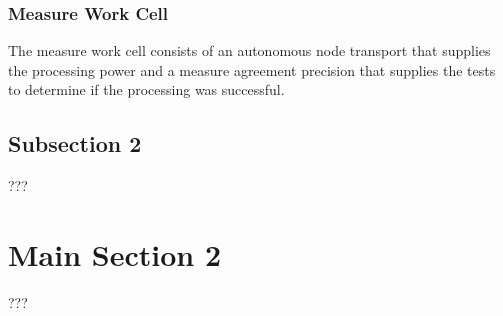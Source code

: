 \subsubsection{Measure Work Cell}
The measure work cell consists of an autonomous node transport that supplies the processing power and a measure agreement precision that supplies the tests to determine if the processing was successful.


\subsection{Subsection 2}

???


\section{Main Section 2}

???
